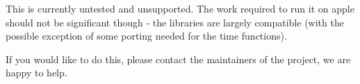 \-This is currently untested and unsupported. \-The work required to run it on apple should not be significant though -\/ the libraries are largely compatible (with the possible exception of some porting needed for the time functions).

\-If you would like to do this, please contact the maintainers of the project, we are happy to help. 